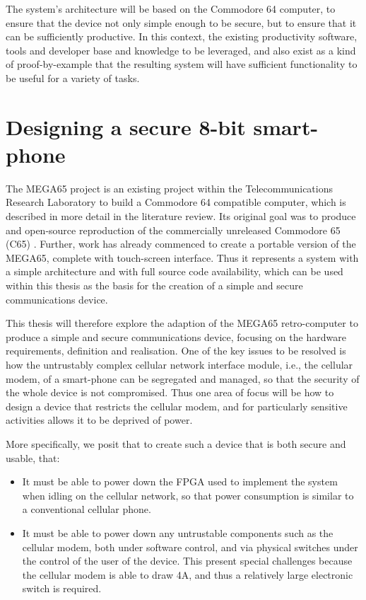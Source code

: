 The system’s architecture will be based on the Commodore 64 computer, to ensure that the device not only simple enough to be secure, but to ensure that it can be sufficiently productive.
In this context, the existing productivity software, tools and developer base and knowledge to be leveraged, and also exist as a kind of proof-by-example that the resulting system will have sufficient functionality to be useful for a variety of tasks.


\section{Designing a secure 8-bit smart-phone}
\label{sec2}

The MEGA65 project is an existing project within the Telecommunications Research Laboratory to build a Commodore 64 compatible computer, which is described in more detail in the literature review.
Its original goal was to produce and open-source reproduction of the commercially unreleased Commodore 65 (C65) \cite{MEGA65MO64:online}.
Further, work has already commenced to create a portable version of the MEGA65, complete with touch-screen interface.
Thus it represents a system with a simple architecture and with full source code availability, which can be used within this thesis as the basis for the creation of a simple and secure communications device.

This thesis will therefore explore the adaption of the MEGA65 retro-computer to produce a simple and secure communications device, focusing
on the hardware requirements, definition and realisation.
One of the key issues to be resolved is how the untrustably complex cellular network interface module, i.e., the cellular modem, of a smart-phone can be segregated and managed, so that the security of the whole device is not compromised.
Thus one area of focus will be how to design a device that restricts the cellular modem, and for particularly sensitive activities allows it to be deprived of power.

More specifically, we posit that to create such a device that is both secure and usable, that:
\begin{itemize}
	\item It must be able to power down the FPGA used to implement the system when idling on the cellular network, so that power consumption is similar to a conventional cellular phone.\\
	\item It must be able to power down any untrustable components such as the cellular modem, both under software control, and via physical switches under the control of the user of the device. This present special challenges because the cellular modem is able to draw 4A, and thus a relatively large electronic switch is required.\\
\end{itemize}

